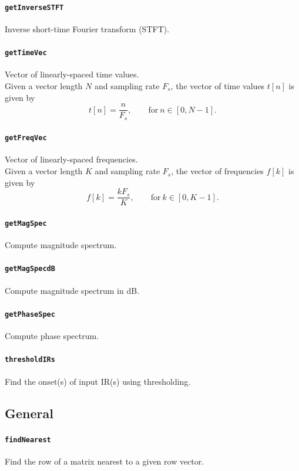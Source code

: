 \documentclass[11pt, oneside]{article}
\newcommand{\function}[1]{\paragraph*{\texttt{#1}}}
\begin{document}
\function{getInverseSTFT} Inverse short-time Fourier transform (STFT). \\

\function{getTimeVec} Vector of linearly-spaced time values. \\
Given a vector length $N$ and sampling rate $F_s$, the vector of time values $t[n]$ is given by
\begin{equation}
t[n] = \frac{n}{F_s}, \quad\quad \text{for} ~ n \in [0, N-1].
\end{equation}

\function{getFreqVec} Vector of linearly-spaced frequencies. \\
Given a vector length $K$ and sampling rate $F_s$, the vector of frequencies $f[k]$ is given by
\begin{equation}
f[k] = \frac{k F_s}{K}, \quad\quad \text{for} ~ k \in [0, K-1].
\end{equation}

\function{getMagSpec} Compute magnitude spectrum. \\

\function{getMagSpecdB} Compute magnitude spectrum in dB. \\

\function{getPhaseSpec} Compute phase spectrum. \\

\function{thresholdIRs} Find the onset(s) of input IR(s) using thresholding. \\


%

\subsection{General}

\function{findNearest} Find the row of a matrix nearest to a given row vector. \\
\end{document}
